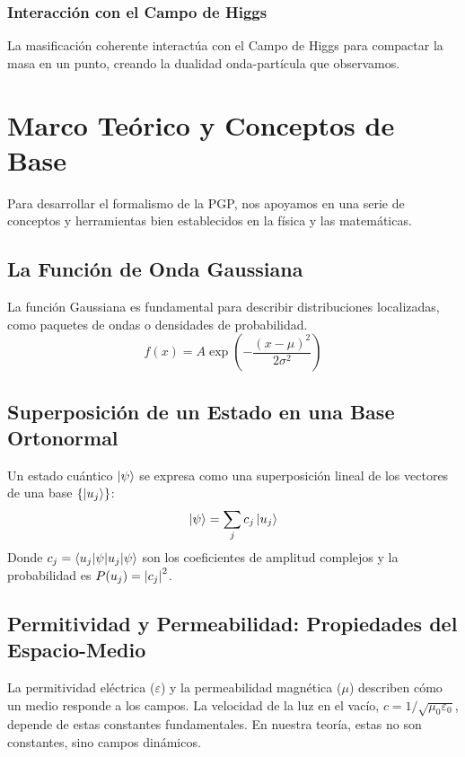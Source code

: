\documentclass{book} %
\begin{document}
\subsection{Interacción con el Campo de Higgs}
La masificación coherente interactúa con el Campo de Higgs para compactar la masa en un punto, creando la dualidad onda-partícula que observamos.

\chapter{Marco Teórico y Conceptos de Base}
\label{sec:fundamentos}
Para desarrollar el formalismo de la PGP, nos apoyamos en una serie de conceptos y herramientas bien establecidos en la física y las matemáticas.

\section{La Función de Onda Gaussiana}
La función Gaussiana es fundamental para describir distribuciones localizadas, como paquetes de ondas o densidades de probabilidad.
\begin{equation}
    f(x) = A \exp\left(-\frac{(x - \mu)^2}{2\sigma^2}\right)
    \label{eq:gaussiana1D}
\end{equation}

\section{Superposición de un Estado en una Base Ortonormal}
Un estado cuántico $\ket{\psi}$ se expresa como una superposición lineal de los vectores de una base $\{\ket{u_j}\}$:
\begin{equation}
    \ket{\psi} = \sum_{j} c_j \ket{u_j}
    \label{eq:superposicion_general}
\end{equation}
Donde $c_j = \braket{u_j | \psi}$ son los coeficientes de amplitud complejos y la probabilidad es $P(u_j) = \abs{c_j}^2$.

\section{Permitividad y Permeabilidad: Propiedades del Espacio-Medio}
La permitividad eléctrica ($\varepsilon$) y la permeabilidad magnética ($\mu$) describen cómo un medio responde a los campos. La velocidad de la luz en el vacío, $c = 1/\sqrt{\mu_0 \varepsilon_0}$, depende de estas constantes fundamentales. En nuestra teoría, estas no son constantes, sino campos dinámicos.
\end{document}
